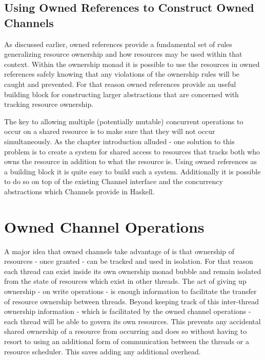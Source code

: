 \documentclass[onehalf,11pt]{beavtex}
\begin{document}
\subsection{Using Owned References to Construct Owned Channels}

As discussed earlier, owned references provide a fundamental set of
rules generalizing resource ownership and how resources may be used within that
context.  Within the ownership monad it is possible to use the
resources in owned references safely knowing that any violations of
the ownership rules will be caught and prevented.  For that reason
owned references provide an useful building block for constructing
larger abstractions that are concerned with tracking resource ownership.

The key to allowing multiple (potentially mutable) concurrent operations to occur
on a shared resource is to make sure that they will not occur simultaneously.
As the chapter introduction alluded - one solution to this problem is to
create a system for shared access to resources that tracks both who owns the
resource in addition to what the resource is.
Using owned references as a building block it is quite easy to build
such a system. Additionally it is possible to do so on top of the existing
Channel interface and the concurrency abstractions which Channels provide in
Haskell.


\section{Owned Channel Operations}

A major idea that owned channels take advantage of is that ownership
of resources - once granted - can be tracked and used in isolation. For that reason
each thread can exist inside its own ownership monad bubble and
remain isolated from the state of resources which exist in other threads.
The act of giving up ownership - on write operations - is enough information to
facilitate the transfer of resource ownership between threads.
Beyond keeping track of this inter-thread ownership information - which is
facilitated by the owned channel operations - each thread will be able
to govern its own resources.  This prevents any accidental shared ownership of
a resource from occurring and does so without having to resort to using an
additional form of communication between the threads or a resource scheduler.
This saves adding any additional overhead.
\end{document}
